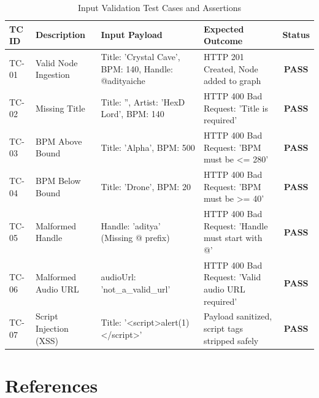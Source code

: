 \documentclass[12pt,a4paper,oneside]{report}
\begin{document}
\begin{table}[H]
\centering
\small
\caption{Input Validation Test Cases and Assertions}
\label{tab:tc_matrix}
\begin{tabularx}{\textwidth}{llXXc}
\toprule
\textbf{TC ID} & \textbf{Description} & \textbf{Input Payload} & \textbf{Expected Outcome} & \textbf{Status} \\
\midrule
TC-01 & Valid Node Ingestion & Title: 'Crystal Cave', BPM: 140, Handle: @adityaiche & HTTP 201 Created, Node added to graph & \textbf{PASS} \\
TC-02 & Missing Title & Title: '', Artist: 'HexD Lord', BPM: 140 & HTTP 400 Bad Request: 'Title is required' & \textbf{PASS} \\
TC-03 & BPM Above Bound & Title: 'Alpha', BPM: 500 & HTTP 400 Bad Request: 'BPM must be <= 280' & \textbf{PASS} \\
TC-04 & BPM Below Bound & Title: 'Drone', BPM: 20 & HTTP 400 Bad Request: 'BPM must be >= 40' & \textbf{PASS} \\
TC-05 & Malformed Handle & Handle: 'aditya' (Missing @ prefix) & HTTP 400 Bad Request: 'Handle must start with @' & \textbf{PASS} \\
TC-06 & Malformed Audio URL & audioUrl: 'not\_a\_valid\_url' & HTTP 400 Bad Request: 'Valid audio URL required' & \textbf{PASS} \\
TC-07 & Script Injection (XSS) & Title: '\textless script\textgreater alert(1)\textless/script\textgreater' & Payload sanitized, script tags stripped safely & \textbf{PASS} \\
\bottomrule
\end{tabularx}
\end{table}

\chapter*{References}
\end{document}
